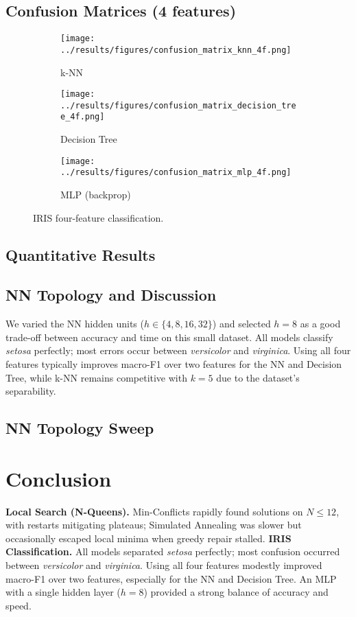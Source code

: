 \documentclass[11pt,a4paper]{article}
\begin{document}
\subsection{Confusion Matrices (4 features)}
\begin{figure}[H]\centering
  \begin{subfigure}{.32\linewidth}
    \texttt{[image: ../results/figures/confusion\_matrix\_knn\_4f.png]}
    \caption{k-NN}
  \end{subfigure}\hfill
  \begin{subfigure}{.32\linewidth}
    \texttt{[image: ../results/figures/confusion\_matrix\_decision\_tree\_4f.png]}
    \caption{Decision Tree}
  \end{subfigure}\hfill
  \begin{subfigure}{.32\linewidth}
    \texttt{[image: ../results/figures/confusion\_matrix\_mlp\_4f.png]}
    \caption{MLP (backprop)}
  \end{subfigure}
  \caption{IRIS four-feature classification.}
\end{figure}

\subsection{Quantitative Results}


\subsection{NN Topology and Discussion}
We varied the NN hidden units ($h\in\{4,8,16,32\}$) and selected $h=8$ as a good trade-off between accuracy and time on this small dataset. All models classify \emph{setosa} perfectly; most errors occur between \emph{versicolor} and \emph{virginica}. Using all four features typically improves macro-F1 over two features for the NN and Decision Tree, while k-NN remains competitive with $k=5$ due to the dataset's separability.

\subsection{NN Topology Sweep}


\section*{Conclusion}
\textbf{Local Search (N-Queens).} Min-Conflicts rapidly found solutions on $N\le12$, with restarts mitigating plateaus; Simulated Annealing was slower but occasionally escaped local minima when greedy repair stalled. \textbf{IRIS Classification.} All models separated \emph{setosa} perfectly; most confusion occurred between \emph{versicolor} and \emph{virginica}. Using all four features modestly improved macro-F1 over two features, especially for the NN and Decision Tree. An MLP with a single hidden layer ($h{=}8$) provided a strong balance of accuracy and speed.
\end{document}
